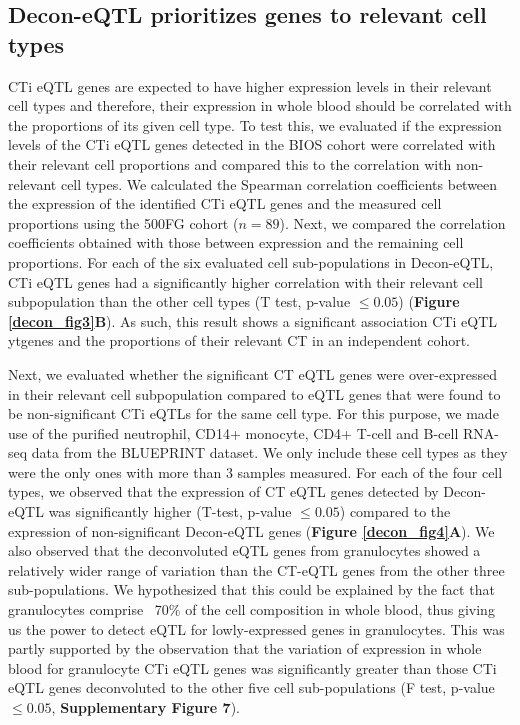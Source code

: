\subsection{Decon-eQTL prioritizes genes to relevant cell types}
CTi eQTL genes are expected to have higher expression levels in their relevant cell types and therefore, their expression in whole blood should be correlated with the proportions of its given cell type. To test this, we evaluated if the expression levels of the CTi eQTL genes detected in the BIOS cohort were correlated with their relevant cell proportions and compared this to the correlation with non-relevant cell types. We calculated the Spearman correlation coefficients between the expression of the identified CTi eQTL genes and the measured cell proportions using the 500FG cohort ($n = 89$). Next, we compared the correlation coefficients obtained with those between expression and the remaining cell proportions. For each of the six evaluated cell sub-populations in Decon-eQTL, CTi eQTL genes had a significantly higher correlation with their relevant cell subpopulation than the other cell types (T test, p-value $\leq 0.05$) (\textbf{Figure \ref{decon_fig3}B}). As such, this result shows a significant association CTi eQTL ytgenes and the proportions of their relevant CT in an independent cohort.

Next, we evaluated whether the significant CT eQTL genes were over-expressed in their relevant cell subpopulation compared to eQTL genes that were found to be non-significant CTi eQTLs for the same cell type. For this purpose, we made use of the purified neutrophil, CD14+ monocyte, CD4+ T-cell and B-cell RNA-seq data from the BLUEPRINT dataset. We only include these cell types as they were the only ones with more than 3 samples measured. For each of the four cell types, we observed that the expression of CT eQTL genes detected by Decon-eQTL was significantly higher (T-test, p-value $\leq 0.05$) compared to the expression of non-significant Decon-eQTL genes (\textbf{Figure \ref{decon_fig4}A}). We also observed that the deconvoluted eQTL genes from granulocytes showed a relatively wider range of variation than the CT-eQTL genes from the other three sub-populations. We hypothesized that this could be explained by the fact that granulocytes comprise ~70\% of the cell composition in whole blood, thus giving us the power to detect eQTL for lowly-expressed genes in granulocytes. This was partly supported by the observation that the variation of expression in whole blood for granulocyte CTi eQTL genes was significantly greater than those CTi eQTL genes deconvoluted to the other five cell sub-populations (F test, p-value $\leq 0.05$, \textbf{Supplementary Figure 7}). 

